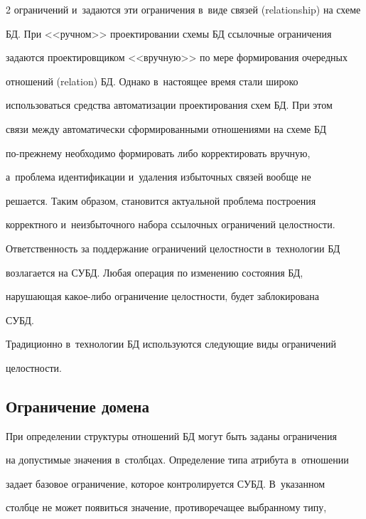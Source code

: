 \begin{multicols}{2}
ограничений и~задаются эти ограничения в~виде связей (relationship) на схеме

БД. При <<ручном>> проектировании схемы БД ссылочные ограничения

задаются проектировщиком <<вручную>> по мере формирования очередных

отношений (relation) БД. Однако в~настоящее время стали широко

использоваться средства автоматизации проектирования схем БД. При этом

связи между автоматически сформированными отношениями на схеме БД

  по-преж\-не\-му необходимо формировать либо корректировать вручную,

а~проблема идентификации и~удаления избыточных связей вообще не

решается. Таким образом, становится актуальной проблема построения

корректного и~неизбыточного набора ссылочных ограничений целостности.



  Ответственность за поддержание ограничений целостности в~технологии БД

возлагается на СУБД. Любая операция по изменению состояния БД,

нарушающая ка\-кое-ли\-бо ограничение целостности, будет заблокирована

СУБД.



  Традиционно в~технологии БД используются следующие виды ограничений

целостности.



\vspace*{-6pt}



\subsection{Ограничение домена}



  При определении структуры отношений БД могут быть заданы ограничения

на допустимые зна\-чения в~столбцах. Определение типа атрибута в~отноше\-нии

задает базовое ограничение, которое контролируется СУБД. В~указанном

столбце не может появиться значение, противоречащее выбранному типу,


\end{multicols}
